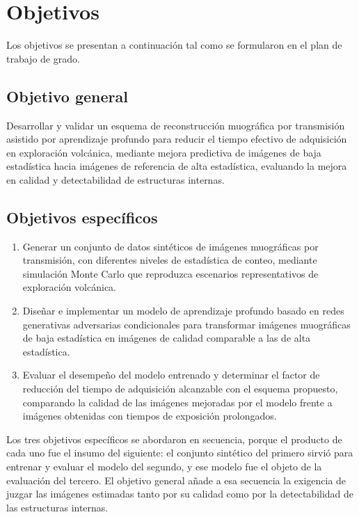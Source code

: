 \section{Objetivos}
\label{sec:intro-objetivos}

Los objetivos se presentan a continuación tal como se formularon en el plan de trabajo de grado.

\subsection{Objetivo general}
\label{subsec:intro-objetivo-general}

Desarrollar y validar un esquema de reconstrucción muográfica por transmisión asistido por aprendizaje profundo para reducir el tiempo efectivo de adquisición en exploración volcánica, mediante mejora predictiva de imágenes de baja estadística hacia imágenes de referencia de alta estadística, evaluando la mejora en calidad y detectabilidad de estructuras internas.

\subsection{Objetivos específicos}
\label{subsec:intro-objetivos-especificos}

\begin{enumerate}[label=\textbf{OE\arabic*.}, leftmargin=*, labelsep=0.6em]
  \item Generar un conjunto de datos sintéticos de imágenes muográficas por transmisión, con diferentes niveles de estadística de conteo, mediante simulación Monte Carlo que reproduzca escenarios representativos de exploración volcánica.
  \item Diseñar e implementar un modelo de aprendizaje profundo basado en redes generativas adversarias condicionales para transformar imágenes muográficas de baja estadística en imágenes de calidad comparable a las de alta estadística.
  \item Evaluar el desempeño del modelo entrenado y determinar el factor de reducción del tiempo de adquisición alcanzable con el esquema propuesto, comparando la calidad de las imágenes mejoradas por el modelo frente a imágenes obtenidas con tiempos de exposición prolongados.
\end{enumerate}

Los tres objetivos específicos se abordaron en secuencia, porque el producto de cada uno fue el insumo del siguiente: el conjunto sintético del primero sirvió para entrenar y evaluar el modelo del segundo, y ese modelo fue el objeto de la evaluación del tercero. El objetivo general añade a esa secuencia la exigencia de juzgar las imágenes estimadas tanto por su calidad como por la detectabilidad de las estructuras internas.

